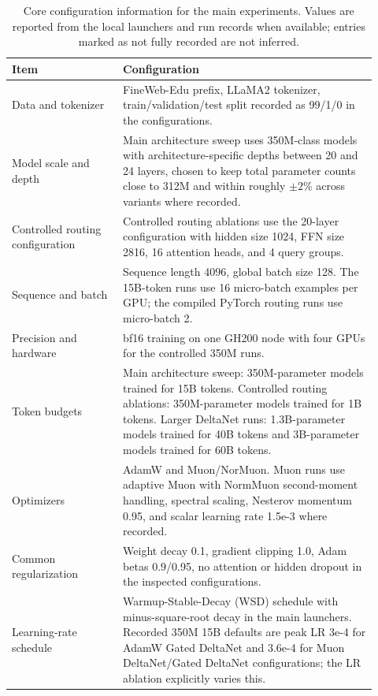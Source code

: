 \documentclass{article}
\begin{document}
\begin{table}[tbp]
    \centering
    \caption{Core configuration information for the main experiments. Values are reported from the local launchers and run records when available; entries marked as not fully recorded are not inferred.}
    \label{tab:core-config}
    \footnotesize
    \begin{tabular}{p{0.28\linewidth}p{0.64\linewidth}}
        \toprule
        Item & Configuration \\
        \midrule
        Data and tokenizer & FineWeb-Edu prefix, LLaMA2 tokenizer, train/validation/test split recorded as 99/1/0 in the configurations. \\
        Model scale and depth & Main architecture sweep uses 350M-class models with architecture-specific depths between 20 and 24 layers, chosen to keep total parameter counts close to 312M and within roughly $\pm 2\%$ across variants where recorded. \\
        Controlled routing configuration & Controlled routing ablations use the 20-layer configuration with hidden size 1024, FFN size 2816, 16 attention heads, and 4 query groups. \\
        Sequence and batch & Sequence length 4096, global batch size 128. The 15B-token runs use 16 micro-batch examples per GPU; the compiled PyTorch routing runs use micro-batch 2. \\
        Precision and hardware & bf16 training on one GH200 node with four GPUs for the controlled 350M runs. \\
        Token budgets & Main architecture sweep: 350M-parameter models trained for 15B tokens. Controlled routing ablations: 350M-parameter models trained for 1B tokens. Larger DeltaNet runs: 1.3B-parameter models trained for 40B tokens and 3B-parameter models trained for 60B tokens. \\
        Optimizers & AdamW and Muon/NorMuon. Muon runs use adaptive Muon with NormMuon second-moment handling, spectral scaling, Nesterov momentum 0.95, and scalar learning rate 1.5e-3 where recorded. \\
        Common regularization & Weight decay 0.1, gradient clipping 1.0, Adam betas 0.9/0.95, no attention or hidden dropout in the inspected configurations. \\
        Learning-rate schedule & Warmup-Stable-Decay (WSD) schedule with minus-square-root decay in the main launchers. Recorded 350M 15B defaults are peak LR 3e-4 for AdamW Gated DeltaNet and 3.6e-4 for Muon DeltaNet/Gated DeltaNet configurations; the LR ablation explicitly varies this. \\

\end{tabular}
\end{table}
\end{document}
